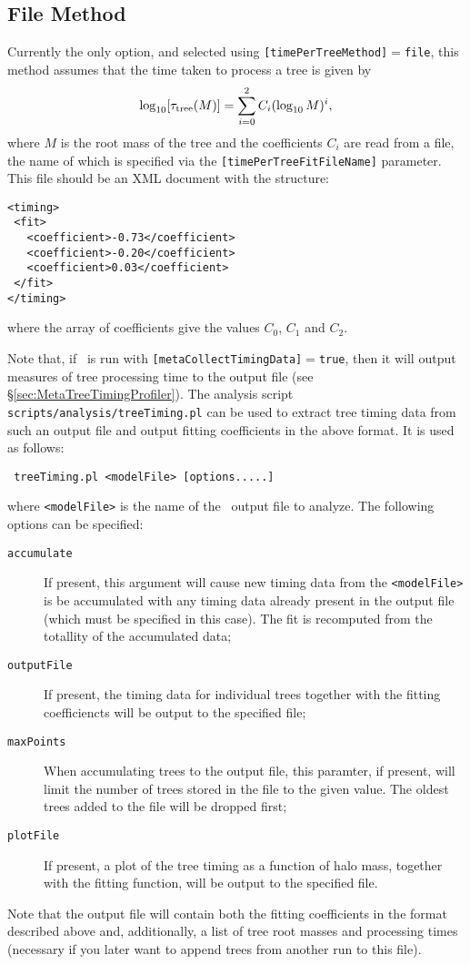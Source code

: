 \subsection{File Method}

Currently the only option, and selected using {\tt [timePerTreeMethod]}$=${\tt file}, this method assumes that the time taken to process a tree is given by
\begin{equation}
 \log_{10} [ \tau_{\rm tree}(M)] = \sum_{i=0}^2 C_i (\log_{10} M)^i,
\end{equation}
where $M$ is the root mass of the tree and the coefficients $C_i$ are read from a file, the name of which is specified via the {\tt [timePerTreeFitFileName]} parameter. This file should be an XML document with the structure:
\begin{verbatim}
<timing>
 <fit>
   <coefficient>-0.73</coefficient>
   <coefficient>-0.20</coefficient>
   <coefficient>0.03</coefficient>
 </fit>
</timing>
\end{verbatim}
where the array of coefficients give the values $C_0$, $C_1$ and $C_2$.

Note that, if \glc\ is run with {\tt [metaCollectTimingData]}$=${\tt true}, then it will output measures of tree processing time to the output file (see \S\ref{sec:MetaTreeTimingProfiler}). The analysis script {\tt scripts/analysis/treeTiming.pl} can be used to extract tree timing data from such an output file and output fitting coefficients in the above format. It is used as follows:
\begin{verbatim}
 treeTiming.pl <modelFile> [options.....]
\end{verbatim}
where {\tt <modelFile>} is the name of the \glc\ output file to analyze. The following options can be specified:
\begin{description}
 \item [{\tt accumulate}] If present, this argument will cause new timing data from the {\tt <modelFile>} is be accumulated with any timing data already present in the output file (which must be specified in this case). The fit is recomputed from the totallity of the accumulated data;
 \item [{\tt outputFile}] If present, the timing data for individual trees together with the fitting coefficiencts will be output to the specified file;
 \item [{\tt maxPoints}] When accumulating trees to the output file, this paramter, if present, will limit the number of trees stored in the file to the given value. The oldest trees added to the file will be dropped first;
 \item [{\tt plotFile}] If present, a plot of the tree timing as a function of halo mass, together with the fitting function, will be output to the specified file.
\end{description}
Note that the output file will contain both the fitting coefficients in the format described above and, additionally, a list of tree root masses and processing times (necessary if you later want to append trees from another run to this file).
